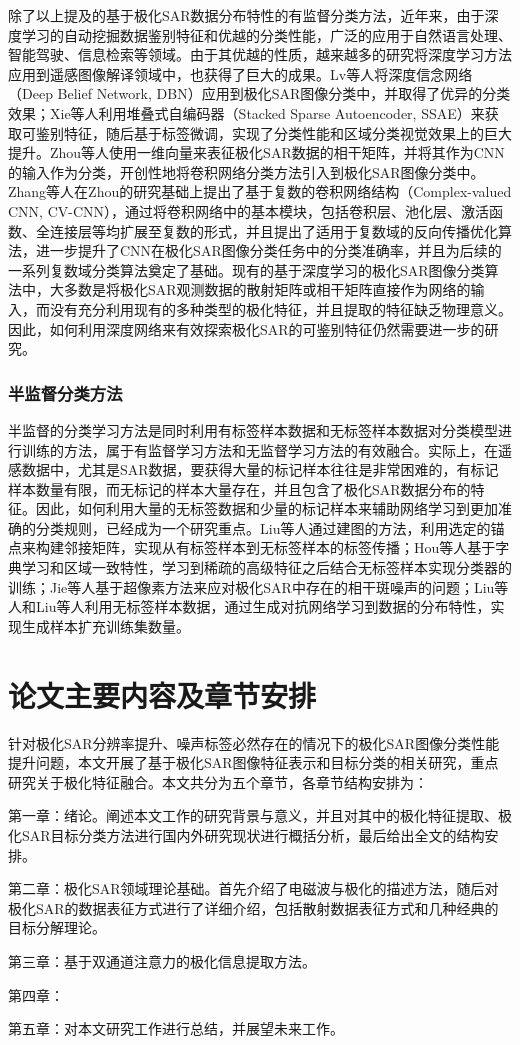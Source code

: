 除了以上提及的基于极化SAR数据分布特性的有监督分类方法，近年来，由于深度学习的自动挖掘数据鉴别特征和优越的分类性能，广泛的应用于自然语言处理、智能驾驶、信息检索等领域。由于其优越的性质，越来越多的研究将深度学习方法应用到遥感图像解译领域中，也获得了巨大的成果。Lv等人将深度信念网络（Deep Belief Network, DBN）应用到极化SAR图像分类中，并取得了优异的分类效果\citing{}；Xie等人利用堆叠式自编码器（Stacked Sparse Autoencoder, SSAE）来获取可鉴别特征，随后基于标签微调，实现了分类性能和区域分类视觉效果上的巨大提升\citing{}。Zhou等人使用一维向量来表征极化SAR数据的相干矩阵，并将其作为CNN的输入作为分类，开创性地将卷积网络分类方法引入到极化SAR图像分类中\citing{}。Zhang等人在Zhou的研究基础上提出了基于复数的卷积网络结构（Complex-valued CNN, CV-CNN），通过将卷积网络中的基本模块，包括卷积层、池化层、激活函数、全连接层等均扩展至复数的形式，并且提出了适用于复数域的反向传播优化算法，进一步提升了CNN在极化SAR图像分类任务中的分类准确率\citing{}，并且为后续的一系列复数域分类算法奠定了基础\citing{}。现有的基于深度学习的极化SAR图像分类算法中，大多数是将极化SAR观测数据的散射矩阵或相干矩阵直接作为网络的输入，而没有充分利用现有的多种类型的极化特征，并且提取的特征缺乏物理意义。因此，如何利用深度网络来有效探索极化SAR的可鉴别特征仍然需要进一步的研究。

\subsubsection{半监督分类方法}
半监督的分类学习方法是同时利用有标签样本数据和无标签样本数据对分类模型进行训练的方法，属于有监督学习方法和无监督学习方法的有效融合。实际上，在遥感数据中，尤其是SAR数据，要获得大量的标记样本往往是非常困难的，有标记样本数量有限，而无标记的样本大量存在，并且包含了极化SAR数据分布的特征。因此，如何利用大量的无标签数据和少量的标记样本来辅助网络学习到更加准确的分类规则，已经成为一个研究重点。Liu等人\citing{}通过建图的方法，利用选定的锚点来构建邻接矩阵，实现从有标签样本到无标签样本的标签传播；Hou等人\citing{}基于字典学习和区域一致特性，学习到稀疏的高级特征之后结合无标签样本实现分类器的训练；Jie等人\citing{}基于超像素方法来应对极化SAR中存在的相干斑噪声的问题；Liu等人\citing{}和Liu等人\citing{}利用无标签样本数据，通过生成对抗网络学习到数据的分布特性，实现生成样本扩充训练集数量。

\section{论文主要内容及章节安排}
针对极化SAR分辨率提升、噪声标签必然存在的情况下的极化SAR图像分类性能提升问题，本文开展了基于极化SAR图像特征表示和目标分类的相关研究，重点研究关于极化特征融合。本文共分为五个章节，各章节结构安排为：

第一章：绪论。阐述本文工作的研究背景与意义，并且对其中的极化特征提取、极化SAR目标分类方法进行国内外研究现状进行概括分析，最后给出全文的结构安排。

第二章：极化SAR领域理论基础。首先介绍了电磁波与极化的描述方法，随后对极化SAR的数据表征方式进行了详细介绍，包括散射数据表征方式和几种经典的目标分解理论。

第三章：基于双通道注意力的极化信息提取方法。

第四章：

第五章：对本文研究工作进行总结，并展望未来工作。